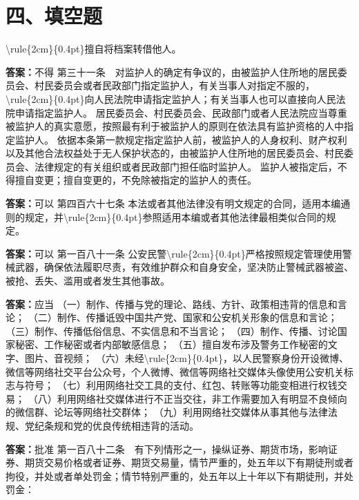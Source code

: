 \documentclass[12pt]{ctexart}
\begin{document}
\section*{四、填空题}
\begin{questions}
\question \textbackslash{}rule\{2cm\}\{0.4pt\}擅自将档案转借他人。
\ifprintanswers\par\textbf{答案：}不得\fi
\question 第三十一条　对监护人的确定有争议的，由被监护人住所地的居民委员会、村民委员会或者民政部门指定监护人，有关当事人对指定不服的，\textbackslash{}rule\{2cm\}\{0.4pt\}向人民法院申请指定监护人；有关当事人也可以直接向人民法院申请指定监护人。
居民委员会、村民委员会、民政部门或者人民法院应当尊重被监护人的真实意愿，按照最有利于被监护人的原则在依法具有监护资格的人中指定监护人。
依据本条第一款规定指定监护人前，被监护人的人身权利、财产权利以及其他合法权益处于无人保护状态的，由被监护人住所地的居民委员会、村民委员会、法律规定的有关组织或者民政部门担任临时监护人。
监护人被指定后，不得擅自变更；擅自变更的，不免除被指定的监护人的责任。
\ifprintanswers\par\textbf{答案：}可以\fi
\question 第四百六十七条 本法或者其他法律没有明文规定的合同，适用本编通则的规定，并\textbackslash{}rule\{2cm\}\{0.4pt\}参照适用本编或者其他法律最相类似合同的规定。
\ifprintanswers\par\textbf{答案：}可以\fi
\question 第一百八十一条 公安民警\textbackslash{}rule\{2cm\}\{0.4pt\}严格按照规定管理使用警械武器，确保依法履职尽责，有效维护群众和自身安全，坚决防止警械武器被盗、被抢、丢失、滥用或者发生其他事故。
\ifprintanswers\par\textbf{答案：}应当\fi
\question （一）制作、传播与党的理论、路线、方针、政策相违背的信息和言论；
（二）制作、传播诋毁中国共产党、国家和公安机关形象的信息和言论；
（三）制作、传播低俗信息、不实信息和不当言论；
（四）制作、传播、讨论国家秘密、工作秘密或者内部敏感信息；
（五）擅自发布涉及警务工作秘密的文字、图片、音视频；
（六）未经\textbackslash{}rule\{2cm\}\{0.4pt\}，以人民警察身份开设微博、微信等网络社交平台公众号，个人微博、微信等网络社交媒体头像使用公安机关标志与符号；
（七）利用网络社交工具的支付、红包、转账等功能变相进行权钱交易；
（八）利用网络社交媒体进行不正当交往，非工作需要加入有明显不良倾向的微信群、论坛等网络社交群体；
（九）利用网络社交媒体从事其他与法律法规、党纪条规和党的优良传统相违背的活动。
\ifprintanswers\par\textbf{答案：}批准\fi
\question 第一百八十二条　有下列情形之一，操纵证券、期货市场，影响证券、期货交易价格或者证券、期货交易量，情节严重的，处五年以下有期徒刑或者拘役，并处或者单处罚金；情节特别严重的，处五年以上十年以下有期徒刑，并处罚金：

\end{questions}
\end{document}
